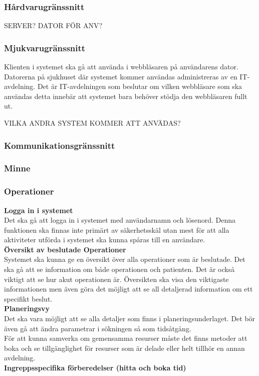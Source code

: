 \documentclass{article}
\begin{document}
\begin{enumerate}
\subsubsection{Hårdvarugränssnitt}
\label{subsec:Hardvarugranssnitt}
SERVER? DATOR FÖR ANV?
\subsubsection{Mjukvarugränssnitt}
\label{subsec:Mjukvarugranssnitt}
Klienten i systemet ska gå att använda i webbläsaren på användarens dator.
Datorerna på sjukhuset där systemet kommer användas administreras av en
IT-avdelning. Det är IT-avdelningen som beslutar om vilken webbläsare som ska
användas detta innebär att systemet bara behöver stödja den webbläsaren fullt
ut.

VILKA ANDRA SYSTEM KOMMER ATT ANVÄDAS?
\subsubsection{Kommunikationsgränssnitt}
\label{subsec:Kommunikationsgranssnitt}
\subsubsection{Minne}
\label{subsec:Minne}
\subsubsection{Operationer}
\label{subsec:Operationer}
\textbf{Logga in i systemet}\\
Det ska gå att logga in i systemet med användarnamn och lösenord. Denna
funktionen ska finnas inte primärt av säkerhetsskäl utan mest för att alla
aktiviteter utförda i systemet ska kunna spåras till en användare.\\
\textbf{Översikt av beslutade Operationer}\\
Systemet ska kunna ge en översikt över alla operationer som är beslutade.
Det ska gå att se information om både operationen och patienten. Det är också
viktigt att se hur akut operationen är. Översikten ska visa den viktigaste
informationen men även göra det möjligt att se all detaljerad information om ett specifikt beslut.\\
\textbf{Planeringsvy}\\
Det ska vara möjligt att se alla detaljer som finns i planeringsunderlaget.
Det bör även gå att ändra parametrar i sökningen så som tidsåtgång.\\
För att kunna samverka om gemensamma resurser måste det finns metoder att boka
och se tillgänglighet för resurser som är delade eller helt tillhör en annan
avdelning.\\
\textbf{Ingreppsspecifika förberedelser (hitta och boka tid)}\\


\end{enumerate}
\end{document}
